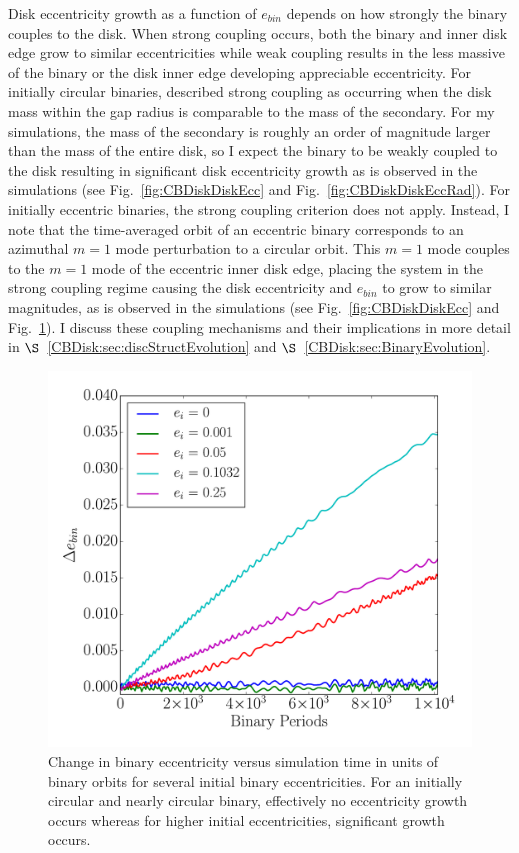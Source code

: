 Disk eccentricity growth as a function of $e_{bin}$ depends on how strongly the binary couples to the disk.  When strong coupling occurs, both the binary and inner disk edge grow to similar eccentricities while weak coupling results in the less massive of the binary or the disk inner edge developing appreciable eccentricity.  For initially circular binaries, \citet{Papaloizou2001} described strong coupling as occurring when the disk mass within the gap radius is comparable to the mass of the secondary.  For my simulations, the mass of the secondary is roughly an order of magnitude larger than the mass of the entire disk, so I expect the binary to be weakly coupled to the disk resulting in significant disk eccentricity growth as is observed in the simulations (see Fig.~\ref{fig:CBDiskDiskEcc} and Fig.~\ref{fig:CBDiskDiskEccRad}).  For initially eccentric binaries, the \citet{Papaloizou2001} strong coupling criterion does not apply.  Instead, I note that the time-averaged orbit of an eccentric binary corresponds to an azimuthal $m = 1$ mode perturbation to a circular orbit.  This $m = 1$ mode couples to the $m = 1$ mode of the eccentric inner disk edge, placing the system in the strong coupling regime causing the disk eccentricity and $e_{bin}$ to grow to similar magnitudes, as is observed in the simulations (see Fig.~\ref{fig:CBDiskDiskEcc} and Fig.~\ref{fig:CBDiskBinEcc}).  I discuss these coupling mechanisms and their implications in more detail in  $\S$~\ref{CBDisk:sec:discStructEvolution} and $\S$~\ref{CBDisk:sec:BinaryEvolution}.

\begin{figure}
	\includegraphics[width=\columnwidth]{f4}
    \caption{Change in binary eccentricity versus simulation time in units of binary orbits for several initial
binary eccentricities. For an initially circular and nearly circular binary, effectively no eccentricity growth occurs whereas 
for higher initial eccentricities, significant growth occurs.}
    \label{fig:CBDiskBinEcc}
\end{figure}

